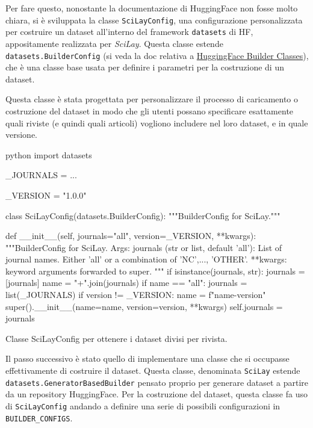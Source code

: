 \documentclass[12pt,a4paper,twoside,openright]{book}
\begin{document}
Per fare questo, nonostante la documentazione di HuggingFace non fosse molto chiara, si è sviluppata la classe \texttt{SciLayConfig}, una configurazione personalizzata per costruire un dataset all'interno del framework \texttt{datasets} di HF, appositamente realizzata per \emph{SciLay}. Questa classe estende \texttt{datasets.BuilderConfig} (si veda la doc relativa a \href{https://huggingface.co/docs/datasets/v2.14.5/en/package_reference/builder_classes}{HuggingFace Builder Classes}), che è una classe base usata per definire i parametri per la costruzione di un dataset.

Questa classe è stata progettata per personalizzare il processo di caricamento o costruzione del dataset in modo che gli utenti possano specificare esattamente quali riviste (e quindi quali articoli) vogliono includere nel loro dataset, e in quale versione.

\begin{customcode}
\begin{mintedbox}{python}
import datasets

_JOURNALS = { ... }

_VERSION = "1.0.0"

class SciLayConfig(datasets.BuilderConfig):
    """BuilderConfig for SciLay."""

    def __init__(self, journals="all", version=_VERSION, **kwargs):
        """BuilderConfig for SciLay.
        Args:
            journals (str or list, default 'all'): List of journal names. Either 'all' or a combination of {'NC',..., 'OTHER'}.
            **kwargs: keyword arguments forwarded to super.
        """
        if isinstance(journals, str):
            journals = [journals]
        name = "+".join(journals)
        if name == "all":
            journals = list(_JOURNALS) 
        if version != _VERSION:
            name = f"{name}-{version}"
        super().__init__(name=name, version=version, **kwargs)
        self.journals = journals
\end{mintedbox}
\caption{Classe SciLayConfig per ottenere i dataset divisi per rivista.}
\end{customcode}

Il passo successivo è stato quello di implementare una classe che si occupasse effettivamente di costruire il dataset. Questa classe, denominata \texttt{SciLay} estende \texttt{datasets.GeneratorBasedBuilder} pensato proprio per generare dataset a partire da un repository HuggingFace.
Per la costruzione del dataset, questa classe fa uso di \texttt{SciLayConfig} andando a definire una serie di possibili configurazioni in \texttt{BUILDER\_CONFIGS}.
\end{document}
